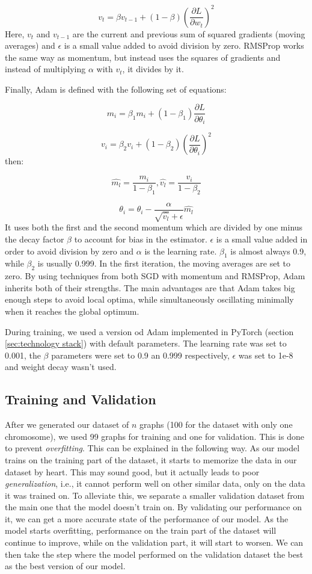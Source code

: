 \documentclass[times, utf8, diplomski, english]{fer_eng}
\begin{document}
\[ v_t = \beta v_{t-1} + (1 - \beta) \left(\frac{\partial L}{\partial w_t}\right)^2 \]
Here, $v_t$ and $v_{t-1}$ are the current and previous sum of squared gradients (moving averages) and $\epsilon$ is a small value added to avoid division by zero. RMSProp works the same way as momentum, but instead uses the squares of gradients and instead of multiplying $\alpha$ with $v_t$, it divides by it.

Finally, Adam is defined with the following set of equations:

\[ m_i = \beta_1 m_i + (1 - \beta_1) \frac{\partial L}{\partial \theta_i} \]


\[ v_i = \beta_2 v_i + (1 - \beta_2) \left(\frac{\partial L}{\partial \theta_i}\right)^2 \]
then:

\[ \widehat{m_l} = \frac{m_i}{1 - \beta_1}, \widehat{v_l} = \frac{v_i}{1 - \beta_2} \]

\[ \theta_i = \theta_i - \frac{\alpha}{\sqrt{\widehat{v_l}} + \epsilon} \widehat{m_l} \]
It uses both the first and the second momentum which are divided by one minus the decay factor $\beta$ to account for bias in the estimator. $\epsilon$ is a small value added in order to avoid division by zero and $\alpha$ is the learning rate. $\beta_1$ is almost always 0.9, while $\beta_2$ is usually 0.999. In the first iteration, the moving averages are set to zero. By using techniques from both SGD with momentum and RMSProp, Adam inherits both of their strengths. The main advantages are that Adam takes big enough steps to avoid local optima, while simultaneously oscillating minimally when it reaches the global optimum.

During training, we used a version od Adam implemented in PyTorch (section \ref{sec:technology stack}) with default parameters. The learning rate was set to 0.001, the $\beta$ parameters were set to 0.9 an 0.999 respectively, $\epsilon$ was set to 1e-8 and weight decay wasn't used.

\subsection{Training and Validation}
\label{subsec:the training process}

After we generated our dataset of $n$ graphs (100 for the dataset with only one chromosome), we used 99 graphs for training and one for validation. This is done to prevent \textit{overfitting}. This can be explained in the following way. As our model trains on the training part of the dataset, it starts to memorize the data in our dataset by heart. This may sound good, but it actually leads to poor \textit{generalization}, i.e., it cannot perform well on other similar data, only on the data it was trained on. To alleviate this, we separate a smaller validation dataset from the main one that the model doesn't train on. By validating our performance on it, we can get a more accurate state of the performance of our model. As the model starts overfitting, performance on the train part of the dataset will continue to improve, while on the validation part, it will start to worsen. We can then take the step where the model performed on the validation dataset the best as the best version of our model.
\end{document}

